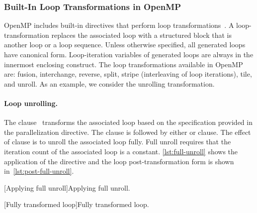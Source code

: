 \subsubsection{Built-In Loop Transformations in OpenMP}
\label{openmp-transforms}

OpenMP includes built-in directives that perform loop transformations~\cite{openmp_api}.
A loop-transformation replaces the associated loop with a structured block
that is another loop or a loop sequence.
Unless otherwise specified, all generated loops have canonical form.
Loop-iteration variables of generated loops are always  in the innermost enclosing construct.
The loop transformations available in OpenMP are:
fusion,
interchange,
reverse,
split,
stripe (interleaving of loop iterations),
tile, and
unroll.
As an example, we consider the unrolling transformation.

\paragraph*{Loop unrolling.}
The  clause~\cite[p. 381--382]{openmp_api}
transforms the associated loop based on the specification provided in the parallelization directive.
The  clause is followed by either  or  clause.
The effect of  clause is to unroll the associated loop fully.
Full unroll requires that the iteration count of the associated loop is a constant.
\autoref{lst:full-unroll} shows the application of the directive and the loop post-transformation form is shown in~\autoref{lst:post-full-unroll}.

\begin{center}
\begin{minipage}{\textwidth}
\begin{minipage}{.45\textwidth}
[Applying full unroll]{Applying full unroll.}
\label{lst:full-unroll}
\end{minipage}\hfill%
\begin{minipage}{.45\textwidth}
[Fully transformed loop]{Fully transformed loop.}
\label{lst:post-full-unroll}
\end{minipage}
\end{minipage}
\end{center}

